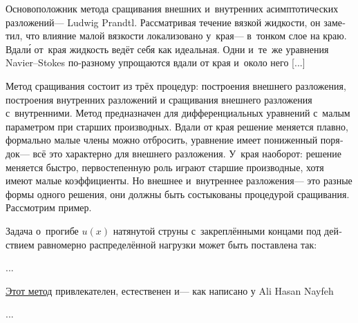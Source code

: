 \begin{otherlanguage}{russian}

Основоположник метода сращивания внешних и~внутренних асимптотических разложений\:--- Ludwig Prandtl.
Рассматривая течение вязкой жидкости, он заметил, что влияние малой вязкости локализовано у~края\:--- в~тонком слое на краю.
Вдал\'{и} от~края жидкость ведёт себя как идеальная.
Одни и~те~же уравнения Navier--Stokes по-разному упрощаются вдали от края и~около него [...]

Метод сращивания состоит из трёх процедур: построения внешнего разложения, построения внутренних разложений и сращивания внешнего разложения с~внутренними.
Метод предназначен для дифференциальных уравнений с~малым параметром при старших производных.
Вдали от края решение меняется плавно, формально малые члены можно отбросить, уравнение имеет пониженный порядок\:--- всё это характерно для внешнего разложения.
У~края наоборот: решение меняется быстро,   первостепенную роль играют старшие производные, хотя имеют малые коэффициенты.
Но внешнее и~внутреннее разложения\:--- это разные формы одного решения, они должны быть состыкованы процедурой сращивания. Рассмотрим пример.

Задача о~прогибе $u(x)$ натянутой струны с~закреплёнными концами под действием равномерно распределённой нагрузки может быть поставлена так:

...

\end{otherlanguage}



\begin{otherlanguage}{russian}

\href{https://en.wikipedia.org/wiki/Multiple-scale_analysis}{Этот метод} привлекателен, естественен и\:--- как написано у Ali Hasan Nayfeh

...



\end{otherlanguage}


